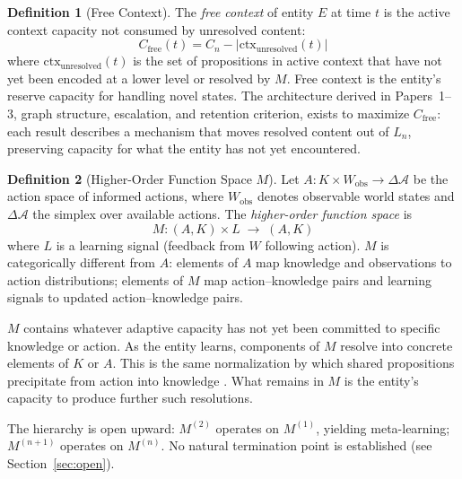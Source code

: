 \documentclass[11pt]{article}
\theoremstyle{definition}
\newtheorem{definition}{Definition}
\theoremstyle{remark}
\begin{document}
\begin{definition}[Free Context]
\label{def:free}
The \emph{free context} of entity $E$ at time $t$ is the active context
capacity not consumed by unresolved content:
\[
C_{\mathrm{free}}(t) = C_n - |\mathrm{ctx}_{\mathrm{unresolved}}(t)|
\]
where $\mathrm{ctx}_{\mathrm{unresolved}}(t)$ is the set of
propositions in active context that have not yet been encoded at a lower
level or resolved by $M$. Free context is the entity's reserve capacity
for handling novel states. The architecture derived in
Papers~1--3, graph structure, escalation, and retention criterion, exists
to maximize $C_{\mathrm{free}}$: each result describes a mechanism that
moves resolved content out of $L_n$, preserving capacity for what the
entity has not yet encountered.
\end{definition}

\begin{definition}[Higher-Order Function Space $M$]
\label{def:M}
Let $A : K \times W_{\mathrm{obs}} \to \Delta \mathcal{A}$ be the
action space of informed actions, where $W_{\mathrm{obs}}$ denotes
observable world states and $\Delta \mathcal{A}$ the simplex over
available actions. The \emph{higher-order function space} is
\[
M : (A, K) \times L \;\to\; (A, K)
\]
where $L$ is a learning signal (feedback from $W$ following action).
$M$ is categorically different from $A$: elements of $A$ map knowledge
and observations to action distributions; elements of $M$ map
action--knowledge pairs and learning signals to updated
action--knowledge pairs.

$M$ contains whatever adaptive capacity has not yet been committed to
specific knowledge or action. As the entity learns, components of $M$
resolve into concrete elements of $K$ or $A$. This is the same normalization
by which shared propositions precipitate from action into knowledge
\cite{McCarthy2026b}. What remains in $M$ is the entity's capacity
to produce further such resolutions.

The hierarchy is open upward: $M^{(2)}$ operates on $M^{(1)}$, yielding
meta-learning; $M^{(n+1)}$ operates on $M^{(n)}$. No natural
termination point is established (see Section~\ref{sec:open}).
\end{definition}
\end{document}
